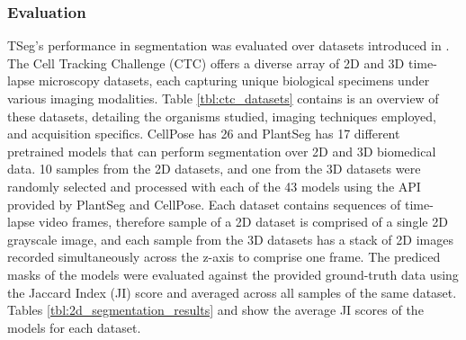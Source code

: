 \documentclass[./dissertation.tex]{subfiles}
\begin{document}
\subsubsection{Evaluation}
TSeg's performance in segmentation was evaluated over datasets introduced in \cite{mavska2023cell}. The Cell Tracking Challenge (CTC) offers a diverse array of 2D and 3D time-lapse microscopy datasets, each capturing unique biological specimens under various imaging modalities. Table \ref{tbl:ctc_datasets} contains is an overview of these datasets, detailing the organisms studied, imaging techniques employed, and acquisition specifics. CellPose has 26 and PlantSeg has 17 different pretrained models that can perform segmentation over 2D and 3D biomedical data. 10 samples from the 2D datasets, and one from the 3D datasets were randomly selected and processed with each of the 43 models using the API provided by PlantSeg and CellPose. Each dataset contains sequences of time-lapse video frames, therefore sample of a 2D dataset is comprised of a single 2D grayscale image, and each sample from the 3D datasets has a stack of 2D images recorded simultaneously across the z-axis to comprise one frame. The prediced masks of the models were evaluated against the provided ground-truth data using the Jaccard Index (JI) score and averaged across all samples of the same dataset. Tables \ref{tbl:2d_segmentation_results} and \cite{tbl:3d_segmentation_results} show the average JI scores of the models for each dataset.
\end{document}
